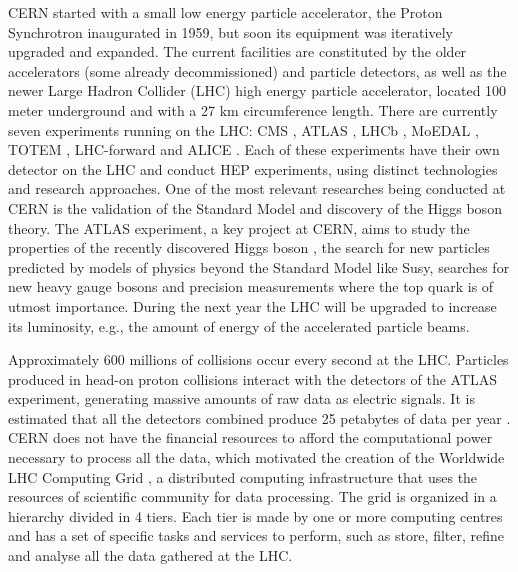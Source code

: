 CERN started with a small low energy particle accelerator, the Proton Synchrotron \cite{CERN:PS} inaugurated in 1959, but soon its equipment was iteratively upgraded and expanded. The current facilities are constituted by the older accelerators (some already decommissioned) and particle detectors, as well as the newer Large Hadron Collider (LHC) \cite{CERN:LHC} high energy particle accelerator, located 100 meter underground and with a 27 km circumference length. There are currently seven experiments running on the LHC: CMS \cite{CERN:CMS}, ATLAS \cite{CERN:ATLAS}, LHCb \cite{CERN:LHCb}, MoEDAL \cite{CERN:MoEDAL}, TOTEM \cite{CERN:TOTEM}, LHC-forward \cite{CERN:LHCf} and ALICE \cite{CERN:ALICE}. Each of these experiments have their own detector on the LHC and conduct HEP experiments, using distinct technologies and research approaches. One of the most relevant researches being conducted at CERN is the validation of the Standard Model and discovery of the Higgs boson theory. The ATLAS experiment, a key project at CERN, aims to study the properties of the recently discovered Higgs boson \cite{Higgs}, the search for new particles predicted by models of physics beyond the Standard Model like Susy, searches for new heavy gauge bosons and precision measurements where the top quark is of utmost importance. During the next year the LHC will be upgraded to increase its luminosity, e.g., the amount of energy of the accelerated particle beams.

Approximately 600 millions of collisions occur every second at the LHC. Particles produced in head-on proton collisions interact with the detectors of the ATLAS experiment, generating massive amounts of raw data as electric signals. It is estimated that all the detectors combined produce 25 petabytes of data per year \cite{CERN:DATA1,CERN:DATA2}. CERN does not have the financial resources to afford the computational power necessary to process all the data, which motivated the creation of the Worldwide LHC Computing Grid \cite{CERN:WLHCCG}, a distributed computing infrastructure that uses the resources of scientific community for data processing. The grid is organized in a hierarchy divided in 4 tiers. Each tier is made by one or more computing centres and has a set of specific tasks and services to perform, such as store, filter, refine and analyse all the data gathered at the LHC.


